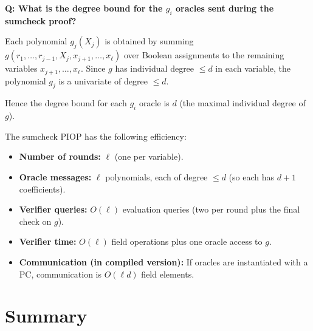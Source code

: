 \documentclass[11pt]{article}
\begin{document}
\begin{remark}
\textbf{Q: What is the degree bound for the $g_i$ oracles sent during the sumcheck proof?}

\medskip
Each polynomial $g_j(X_j)$ is obtained by summing $g(r_1, \ldots, r_{j-1}, X_j, x_{j+1}, \ldots, x_\ell)$ over Boolean assignments to the remaining variables $x_{j+1}, \ldots, x_\ell$.  Since $g$ has individual degree $\le d$ in each variable, the polynomial $g_j$ is a univariate of degree $\le d$.

Hence the degree bound for each $g_i$ oracle is $d$ (the maximal individual degree of $g$).
\end{remark}

\begin{remark}
The sumcheck PIOP has the following efficiency:
\begin{itemize}
  \item \textbf{Number of rounds:} $\ell$ (one per variable).
  \item \textbf{Oracle messages:} $\ell$ polynomials, each of degree $\le d$ (so each has $d+1$ coefficients).
  \item \textbf{Verifier queries:} $O(\ell)$ evaluation queries (two per round plus the final check on $g$).
  \item \textbf{Verifier time:} $O(\ell)$ field operations plus one oracle access to $g$.
  \item \textbf{Communication (in compiled version):} If oracles are instantiated with a PC, communication is $O(\ell d)$ field elements.
\end{itemize}
\end{remark}

\section{Summary}
\end{document}
